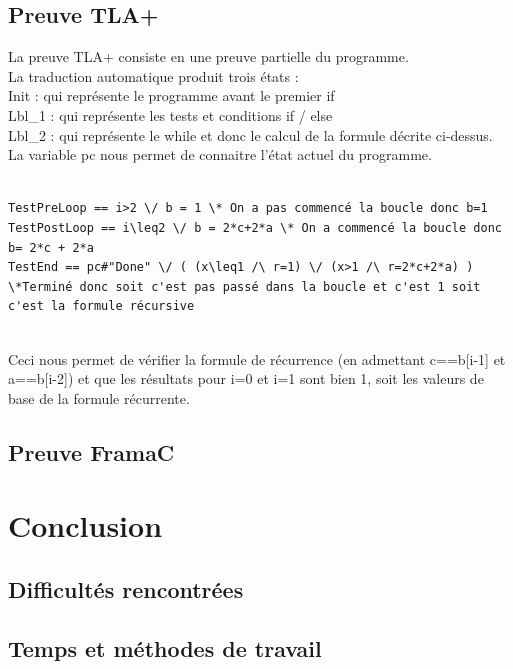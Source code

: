 \documentclass{scrreprt}
\begin{document}
\section{Preuve TLA+}
La preuve TLA+ consiste en une preuve partielle du programme.\\
La traduction automatique produit trois états :\\
Init : qui représente le programme avant le premier if\\
Lbl_1 : qui représente les tests et conditions if / else\\
Lbl_2 : qui représente le while et donc le calcul de la formule décrite ci-dessus.\\
La variable pc nous permet de connaitre l'état actuel du programme.\\
\\
\begin{lstlisting}
TestPreLoop == i>2 \/ b = 1 \* On a pas commencé la boucle donc b=1
TestPostLoop == i\leq2 \/ b = 2*c+2*a \* On a commencé la boucle donc b= 2*c + 2*a
TestEnd == pc#"Done" \/ ( (x\leq1 /\ r=1) \/ (x>1 /\ r=2*c+2*a) ) \*Terminé donc soit c'est pas passé dans la boucle et c'est 1 soit c'est la formule récursive
\end{lstlisting}
\\
Ceci nous permet de vérifier la formule de récurrence (en admettant c==b[i-1] et a==b[i-2]) et que les résultats pour i=0 et i=1 sont bien 1, soit les valeurs de base de la formule récurrente.

\section{Preuve FramaC}

%
%
%

\chapter{Conclusion}


\section{Difficultés rencontrées}

\section{Temps et méthodes de travail}
\end{document}
